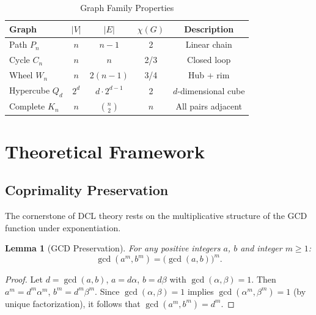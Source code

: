 \documentclass[lettersize,journal]{IEEEtran}
\newtheorem{lemma}[theorem]{Lemma}
\begin{document}
\begin{table}[!t]
\caption{Graph Family Properties\label{tab:graphs}}
\centering
\begin{tabular}{@{}lcccc@{}}
\toprule
\textbf{Graph} & $|V|$ & $|E|$ & $\chi(G)$ & \textbf{Description} \\
\midrule
Path $P_n$       & $n$   & $n{-}1$        & 2         & Linear chain \\
Cycle $C_n$      & $n$   & $n$            & 2/3       & Closed loop \\
Wheel $W_n$      & $n$   & $2(n{-}1)$     & 3/4       & Hub + rim \\
Hypercube $Q_d$  & $2^d$ & $d \cdot 2^{d-1}$ & 2     & $d$-dimensional cube \\
Complete $K_n$   & $n$   & $\binom{n}{2}$ & $n$       & All pairs adjacent \\
\bottomrule
\end{tabular}
\end{table}

\section{Theoretical Framework}
\label{sec:theory}

\subsection{Coprimality Preservation}

The cornerstone of DCL theory rests on the multiplicative structure of the GCD function under exponentiation.

\begin{lemma}[GCD Preservation]
\label{lem:gcd}
For any positive integers $a$, $b$ and integer $m \geq 1$:
\begin{equation}
\gcd(a^m, b^m) = \bigl(\gcd(a, b)\bigr)^m.
\label{eq:gcd_preserve}
\end{equation}
\end{lemma}

\begin{proof}
Let $d = \gcd(a,b)$, $a = d\alpha$, $b = d\beta$ with $\gcd(\alpha,\beta) = 1$. Then $a^m = d^m \alpha^m$, $b^m = d^m \beta^m$. Since $\gcd(\alpha,\beta) = 1$ implies $\gcd(\alpha^m, \beta^m) = 1$ (by unique factorization), it follows that $\gcd(a^m, b^m) = d^m$.
\end{proof}
\end{document}
